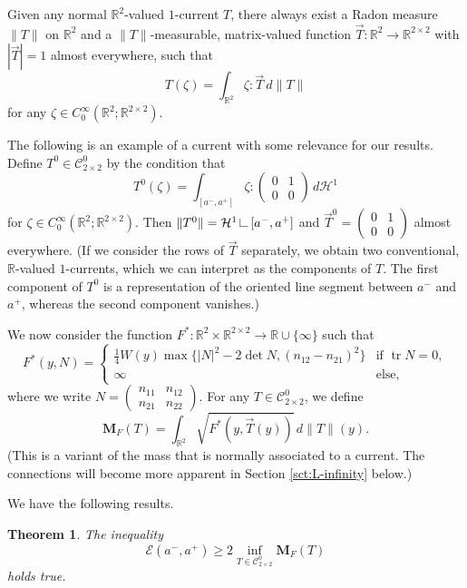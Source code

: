\documentclass[a4paper]{article}
\newcommand{\R}{\mathbb{R}}
\newcommand{\Ha}{\mathcal{H}}
\newcommand{\M}{\mathbf{M}}
\newcommand{\ncrt}{\mathcal{C}}
\DeclareMathOperator{\tr}{tr}
\newcommand{\restr}{\mathchoice
{\kern2pt\mbox{\vrule width 0.08ex height1.5ex depth0ex\kern-0.08ex\vrule width 1.5ex height.08ex depth0ex}\kern2pt}
{\kern2pt\mbox{\vrule width 0.08ex height1.5ex depth0ex\kern-0.08ex\vrule width 1.5ex height.08ex depth0ex}\kern2pt}
{\kern1.5pt\mbox{\vrule width 0.06ex height1.1ex depth0ex\kern-0.06ex\vrule width 1.1ex height.06ex depth0ex}\kern1.5pt}
{\kern1pt\mbox{\vrule width 0.04ex height0.75ex depth0ex\kern-0.04ex\vrule width 0.75ex height.04ex depth0ex}\kern1pt}
}
\newtheorem{theorem}{Theorem}
\theoremstyle{definition}
\theoremstyle{remark}
\begin{document}
Given any normal $\R^2$-valued $1$-current $T$, there always exist a Radon measure $\|T\|$ on $\R^2$ and a
$\|T\|$-measurable, matrix-valued function $\vec{T} \colon \R^2 \to \R^{2 \times 2}$ with
$|\vec{T}| = 1$ almost everywhere, such that
\[
T(\zeta) = \int_{\R^2} \zeta : \vec{T} \, d\|T\|
\]
for any $\zeta \in C_0^\infty(\R^2; \R^{2 \times 2})$.

The following is an example of a current with some relevance for our results. Define
$T^0 \in \ncrt_{2 \times 2}^0$ by the condition that
\begin{equation} \label{eq:line-segment}
T^0(\zeta) = \int_{[a^-, a^+]} \zeta : \begin{pmatrix} 0 & 1 \\ 0 & 0 \end{pmatrix} \, d\Ha^1
\end{equation}
for $\zeta \in C_0^\infty(\R^2; \R^{2 \times 2})$. Then $\|T^0\| = \Ha^1 \restr [a^-, a^+]$
and $\vec{T}^0 = (\begin{smallmatrix} 0 & 1 \\ 0 & 0 \end{smallmatrix})$ almost everywhere.
(If we consider the rows of $\vec{T}$ separately, we obtain two conventional,
$\R$-valued $1$-currents, which we can interpret as the components of $T$.
The first component of $T^0$ is a representation of the oriented line segment
between $a^-$ and $a^+$, whereas the second component vanishes.)

We now consider the function
$F^* \colon \R^2 \times \R^{2 \times 2} \to \R \cup \{\infty\}$ such that
\[
F^*(y, N) = \begin{cases}
\frac{1}{4} W(y) \max\{|N|^2 - 2\det N, (n_{12} - n_{21})^2\} & \text{if $\tr N = 0$}, \\
\infty & \text{else},
\end{cases}
\]
where we write $N = (\begin{smallmatrix} n_{11} & n_{12} \\ n_{21} & n_{22} \end{smallmatrix})$.
For any $T \in \ncrt_{2 \times 2}^0$, we define
\[
\M_F(T) = \int_{\R^2} \sqrt{F^*(y, \vec{T}(y))} \, d\|T\|(y).
\]
(This is a variant of the mass that is normally associated to a current. The connections
will become more apparent in Section \ref{sct:L-infinity} below.)

We have the following results.

\begin{theorem} \label{thm:main}
The inequality
\[
\mathcal{E}(a^-, a^+) \ge 2\inf_{T \in \ncrt_{2 \times 2}^0} \M_F(T)
\]
holds true.
\end{theorem}
\end{document}

